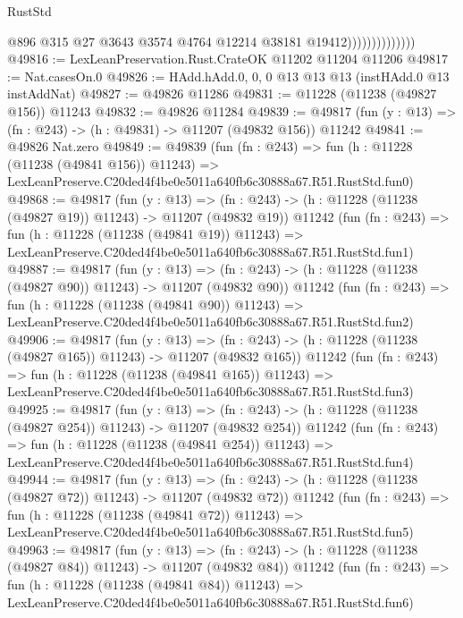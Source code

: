 \begin{lexlean}{RustStd}
\begin{coremodule}
                                @896
                                @315
                                @27
                                @3643
                                @3574
                                @4764
                                @12214
                                @38181
                                @19412))))))))))))))
@49816 := LexLeanPreservation.Rust.CrateOK @11202 @11204 @11206
@49817 := Nat.casesOn.{0}
@49826 := HAdd.hAdd.{0, 0, 0} @13 @13 @13 (instHAdd.{0} @13 instAddNat)
@49827 := @49826 @11286
@49831 := @11228 (@11238 (@49827 @156)) @11243
@49832 := @49826 @11284
@49839 := @49817 (fun (y : @13) => (fn : @243) -> (h : @49831) -> @11207 (@49832 @156)) @11242
@49841 := @49826 Nat.zero
@49849 := @49839
    (fun (fn : @243) =>
    fun (h : @11228 (@11238 (@49841 @156)) @11243) =>
    LexLeanPreserve.C20ded4f4be0e5011a640fb6c30888a67.R51.RustStd.fun0)
@49868 := @49817
    (fun (y : @13) =>
    (fn : @243) -> (h : @11228 (@11238 (@49827 @19)) @11243) -> @11207 (@49832 @19))
    @11242
    (fun (fn : @243) =>
    fun (h : @11228 (@11238 (@49841 @19)) @11243) =>
    LexLeanPreserve.C20ded4f4be0e5011a640fb6c30888a67.R51.RustStd.fun1)
@49887 := @49817
    (fun (y : @13) =>
    (fn : @243) -> (h : @11228 (@11238 (@49827 @90)) @11243) -> @11207 (@49832 @90))
    @11242
    (fun (fn : @243) =>
    fun (h : @11228 (@11238 (@49841 @90)) @11243) =>
    LexLeanPreserve.C20ded4f4be0e5011a640fb6c30888a67.R51.RustStd.fun2)
@49906 := @49817
    (fun (y : @13) =>
    (fn : @243) -> (h : @11228 (@11238 (@49827 @165)) @11243) -> @11207 (@49832 @165))
    @11242
    (fun (fn : @243) =>
    fun (h : @11228 (@11238 (@49841 @165)) @11243) =>
    LexLeanPreserve.C20ded4f4be0e5011a640fb6c30888a67.R51.RustStd.fun3)
@49925 := @49817
    (fun (y : @13) =>
    (fn : @243) -> (h : @11228 (@11238 (@49827 @254)) @11243) -> @11207 (@49832 @254))
    @11242
    (fun (fn : @243) =>
    fun (h : @11228 (@11238 (@49841 @254)) @11243) =>
    LexLeanPreserve.C20ded4f4be0e5011a640fb6c30888a67.R51.RustStd.fun4)
@49944 := @49817
    (fun (y : @13) =>
    (fn : @243) -> (h : @11228 (@11238 (@49827 @72)) @11243) -> @11207 (@49832 @72))
    @11242
    (fun (fn : @243) =>
    fun (h : @11228 (@11238 (@49841 @72)) @11243) =>
    LexLeanPreserve.C20ded4f4be0e5011a640fb6c30888a67.R51.RustStd.fun5)
@49963 := @49817
    (fun (y : @13) =>
    (fn : @243) -> (h : @11228 (@11238 (@49827 @84)) @11243) -> @11207 (@49832 @84))
    @11242
    (fun (fn : @243) =>
    fun (h : @11228 (@11238 (@49841 @84)) @11243) =>
    LexLeanPreserve.C20ded4f4be0e5011a640fb6c30888a67.R51.RustStd.fun6)

\end{coremodule}
\end{lexlean}
